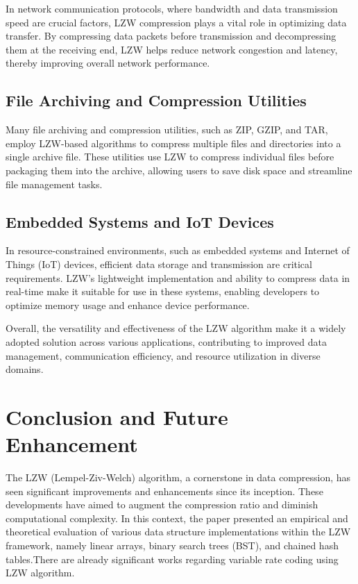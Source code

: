 \documentclass[12pt, a4paper]{article}
\begin{document}
In network communication protocols, where bandwidth and data transmission speed are crucial factors, LZW compression plays a vital role in optimizing data transfer. By compressing data packets before transmission and decompressing them at the receiving end, LZW helps reduce network congestion and latency, thereby improving overall network performance.

\subsection{File Archiving and Compression Utilities}

Many file archiving and compression utilities, such as ZIP, GZIP, and TAR, employ LZW-based algorithms to compress multiple files and directories into a single archive file. These utilities use LZW to compress individual files before packaging them into the archive, allowing users to save disk space and streamline file management tasks.

\subsection{Embedded Systems and IoT Devices}

In resource-constrained environments, such as embedded systems and Internet of Things (IoT) devices, efficient data storage and transmission are critical requirements. LZW's lightweight implementation and ability to compress data in real-time make it suitable for use in these systems, enabling developers to optimize memory usage and enhance device performance.

Overall, the versatility and effectiveness of the LZW algorithm make it a widely adopted solution across various applications, contributing to improved data management, communication efficiency, and resource utilization in diverse domains.

\section{Conclusion and Future Enhancement}

The LZW (Lempel-Ziv-Welch) algorithm, a cornerstone in data compression, has seen significant improvements and enhancements since its inception. These developments have aimed to augment the compression ratio and diminish computational complexity. In this context, the paper presented an empirical and theoretical evaluation of various data structure implementations within the LZW framework, namely linear arrays, binary search trees (BST), and chained hash tables.There are already significant works regarding variable rate coding using LZW algorithm.\cite{ZivLempel1978}   
\end{document}
